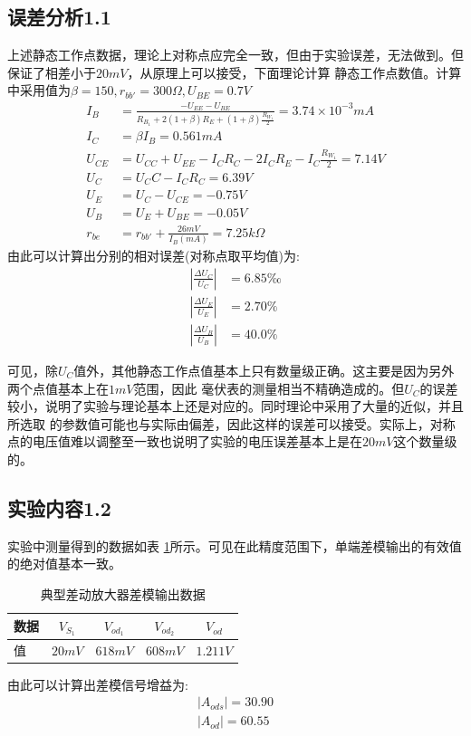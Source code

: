 \documentclass[a4paper,11pt,UTF8]{ctexart}
\begin{document}
	\subsection{误差分析1.1}
	上述静态工作点数据，理论上对称点应完全一致，但由于实验误差，无法做到。但保证了相差小于$20mV$，从原理上可以接受，下面理论计算
	静态工作点数值。计算中采用值为$\beta=150,r_{bb'}=300\Omega,U_{BE}=0.7V$
	\begin{equation}
		\begin{aligned}
			I_{B}&=\frac{-U_{EE}-U_{BE}}{R_{B_1}+2(1+\beta)R_E+(1+\beta)\frac{R_{W_1}}{2}}=3.74\times10^{-3}mA\\
			I_{C}&=\beta I_{B}=0.561mA\\
			U_{CE}&=U_{CC}+U_{EE}-I_CR_C-2I_CR_E-I_C\frac{R_{W_1}}{2}=7.14V\\
			U_C&=U_CC-I_CR_C=6.39V\\
			U_E&=U_C-U_{CE}=-0.75V\\
			U_B&=U_E+U_{BE}=-0.05V\\
			r_{be}&=r_{bb'}+\frac{26mV}{I_B(mA)}=7.25k\Omega
		\end{aligned}
	\end{equation}
	由此可以计算出分别的相对误差(对称点取平均值)为:
	\begin{equation}
		\begin{aligned}
			\left |\frac{\Delta U_C}{U_C}\right |&=6.85‰\\
			\left |\frac{\Delta U_E}{U_E}\right |&=2.70\%\\
			\left |\frac{\Delta U_B}{U_B}\right |&=40.0\%
		\end{aligned}
	\end{equation}
	
	可见，除$U_C$值外，其他静态工作点值基本上只有数量级正确。这主要是因为另外两个点值基本上在$1mV$范围，因此
	毫伏表的测量相当不精确造成的。但$U_C$的误差较小，说明了实验与理论基本上还是对应的。同时理论中采用了大量的近似，并且所选取
	的参数值可能也与实际由偏差，因此这样的误差可以接受。实际上，对称点的电压值难以调整至一致也说明了实验的电压误差基本上是在$20mV$这个数量级的。
	\subsection{实验内容1.2}
	实验中测量得到的数据如表 \ref{tab:ndTab}所示。可见在此精度范围下，单端差模输出的有效值的绝对值基本一致。
	\begin{table}[!h!tbp]
		\caption{典型差动放大器差模输出数据}\label{tab:ndTab}
		\centering
		\begin{tabular}{|l|c|c|c|c|}
			\hline
			数据 &$V_{S_1}$&$V_{od_1}$&$V_{od_2}$&$V_{od}$         \\ \hline
			值   &$20mV$&$618mV$&$608mV$&$1.211V$     \\ \hline
		\end{tabular}
	\end{table}
	由此可以计算出差模信号增益为:
	\begin{equation}
		\begin{aligned}
			\left |A_{ods}\right |=30.90\\
			\left |A_{od}\right |=60.55
		\end{aligned}
	\end{equation}
\end{document}
